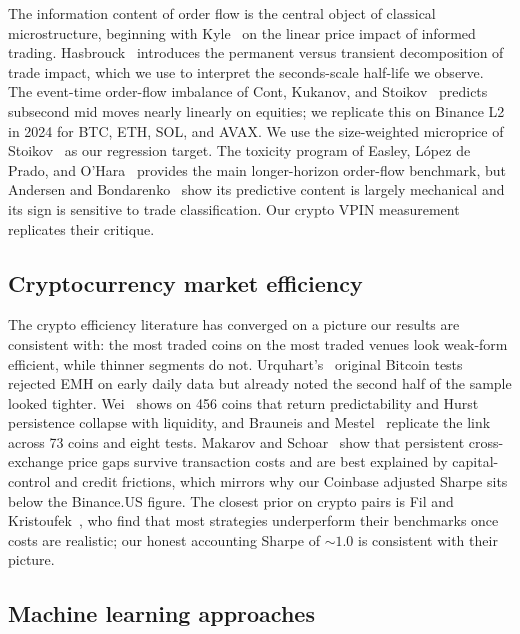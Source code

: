 \documentclass[11pt]{article}
\begin{document}
The information content of order flow is the central object of classical microstructure,
beginning with Kyle~\cite{kyle1985continuous} on the linear price impact of informed
trading. Hasbrouck~\cite{hasbrouck1991measuring} introduces the permanent versus transient
decomposition of trade impact, which we use to interpret the seconds-scale half-life we
observe. The event-time order-flow imbalance of Cont, Kukanov, and
Stoikov~\cite{contkukanovstoikov2014} predicts subsecond mid moves nearly linearly on
equities; we replicate this on Binance L2 in 2024 for BTC, ETH, SOL, and AVAX. We use the
size-weighted microprice of Stoikov~\cite{stoikov2018microprice} as our regression target.
The toxicity program of Easley, L\'opez de Prado, and O'Hara~\cite{easley2012vpin} provides the
main longer-horizon order-flow benchmark, but Andersen and
Bondarenko~\cite{andersen2014vpin} show its predictive content is largely mechanical and
its sign is sensitive to trade classification. Our crypto VPIN measurement replicates their
critique.

\subsection{Cryptocurrency market efficiency}
\label{sec:related-crypto}

The crypto efficiency literature has converged on a picture our results are consistent
with: the most traded coins on the most traded venues look weak-form efficient, while
thinner segments do not. Urquhart's~\cite{urquhart2016inefficiency} original Bitcoin tests
rejected EMH on early daily data but already noted the second half of the sample looked
tighter. Wei~\cite{wei2018liquidity} shows on 456 coins that return predictability and
Hurst persistence collapse with liquidity, and Brauneis and Mestel~\cite{brauneis2018price}
replicate the link across 73 coins and eight tests. Makarov and
Schoar~\cite{makarov2020trading} show that persistent cross-exchange price gaps survive
transaction costs and are best explained by capital-control and credit frictions, which
mirrors why our Coinbase adjusted Sharpe sits below the Binance.US figure. The closest
prior on crypto pairs is Fil and Kristoufek~\cite{fil2020pairs}, who find that most
strategies underperform their benchmarks once costs are realistic; our honest accounting
Sharpe of $\sim$$1.0$ is consistent with their picture.

\subsection{Machine learning approaches}
\label{sec:related-ml}
\end{document}

